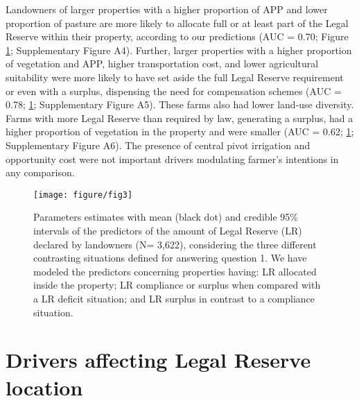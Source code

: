 \documentclass[
	12pt,				%
	oneside,			%
	a4paper,			%
	chapter=TITLE,		%
	section=TITLE,		%
	brazil,			%
	english				%
	]{abntex2}
\begin{document}
Landowners of larger properties with a higher proportion of APP and lower proportion of pasture are more likely to allocate full or at least part of the Legal Reserve within their property, according to our predictions (AUC = 0.70; Figure \ref{fig:Figure3}; Supplementary Figure A4). Further, larger properties with a higher proportion of vegetation and APP, higher transportation cost, and lower agricultural suitability were more likely to have set aside the full Legal Reserve requirement or even with a surplus, dispensing the need for compensation schemes (AUC = 0.78; \ref{fig:Figure3}; Supplementary Figure A5). These farms also had lower land-use diversity. Farms with more Legal Reserve than required by law, generating a surplus, had a higher proportion of vegetation in the property and were smaller (AUC = 0.62; \ref{fig:Figure3}; Supplementary Figure A6). The presence of central pivot irrigation and opportunity cost were not important drivers modulating farmer's intentions in any comparison.
\begin{figure}[H]

{\centering \texttt{[image: figure/fig3]} 

}

\caption{Parameters estimates with mean (black dot) and credible 95\% intervals of the predictors of the amount of Legal Reserve (LR) declared by landowners (N= 3,622), considering the three different contrasting situations defined for answering question 1. We have modeled the predictors concerning properties having: LR allocated inside the property; LR compliance or surplus when compared with a LR deficit situation; and LR surplus in contrast to a compliance situation.}\label{fig:Figure3}
\end{figure}
\hypertarget{drivers-affecting-legal-reserve-location}{%
\section{Drivers affecting Legal Reserve location}\label{drivers-affecting-legal-reserve-location}}
\end{document}
